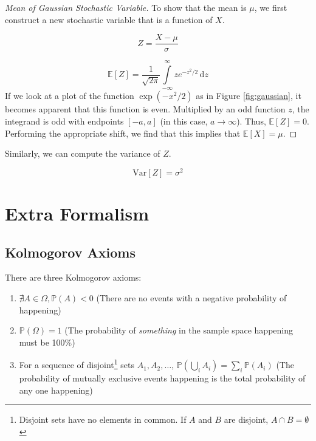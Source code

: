 \documentclass[13pt,oneside]{tufte-book}
\theoremstyle{definition}
\theoremstyle{definition}
\theoremstyle{definition}
\theoremstyle{remark}
\let\BeginKnitrBlock\begin \let\EndKnitrBlock\end
\begin{document}
\BeginKnitrBlock{proof}[Mean of Gaussian Stochastic Variable]
{} To
show that the mean is \(\mu\), we first construct a new stochastic
variable that is a function of \(X\).

\[
Z  = \frac{X-\mu}{\sigma}
\]

\[
\mathbb{E}[Z] = \frac{1}{\sqrt{2\pi}}\int\limits_{-\infty}^{\infty}ze^{-z^2/2}\,\mathrm{d}z
\] If we look at a plot of the function \(\exp(-x^2/2)\) as in Figure
\ref{fig:gaussian}, it becomes apparent that this function is even.
Multiplied by an odd function \(z\), the integrand is odd with endpoints
\([-a,a]\) (in this case, \(a \to \infty\)). Thus, \(\mathbb{E}[Z]=0\).
Performing the appropriate shift, we find that this implies that
\(\mathbb{E}[X] = \mu\).
\EndKnitrBlock{proof}

Similarly, we can compute the variance of \(Z\).

\[
\mathrm{Var}[Z] = \sigma^2
\]

\chapter{Extra Formalism}\label{extra-formalism}

\hypertarget{kmaxm}{\section{Kolmogorov Axioms}\label{kmaxm}}

There are three Kolmogorov axioms:

\begin{enumerate}
\def\labelenumi{\arabic{enumi}.}
\item
  \(\nexists A \in \Omega, \mathbb{P}(A) < 0\) (There are no events with
  a negative probability of happening)
\item
  \(\mathbb{P}(\Omega) = 1\) (The probability of \emph{something} in the
  sample space happening must be 100\%)
\item
  For a sequence of disjoint\footnote{Disjoint sets have no elements in
    common. If \(A\) and \(B\) are disjoint, \(A \cap B = \emptyset\)}
  sets \(A_1, A_2, \dots\),
  \(\mathbb{P}\left( \bigcup_i A_i \right) = \sum_i \mathbb{P}(A_i)\)
  (The probability of mutually exclusive events happening is the total
  probability of any one happening)
\end{enumerate}
\end{document}
